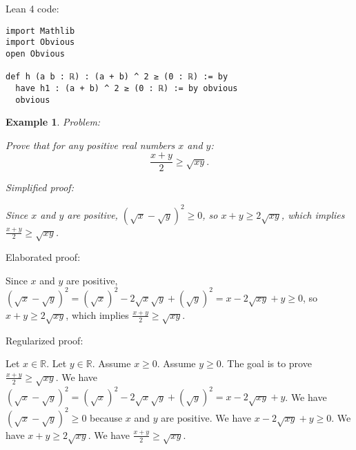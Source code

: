 \documentclass{article}
\newtheorem{example}{Example}
\begin{document}
Lean 4 code:
\begin{tcolorbox}[colback=white!10, width=\linewidth]
\begin{lstlisting}[language=Lean4]
import Mathlib
import Obvious
open Obvious

def h (a b : ℝ) : (a + b) ^ 2 ≥ (0 : ℝ) := by
  have h1 : (a + b) ^ 2 ≥ (0 : ℝ) := by obvious
  obvious

\end{lstlisting}
\end{tcolorbox}


\begin{example}
Problem:
\begin{tcolorbox}[colback=yellow!10, width=\linewidth]
Prove that for any positive real numbers $x$ and $y$:
    $$\frac{x+y}{2} \geq \sqrt{xy}.$$
\end{tcolorbox}

Simplified proof:
\begin{tcolorbox}[colback=blue!10, width=\linewidth]
Since $x$ and $y$ are positive, $(\sqrt x - \sqrt y)^2 \ge 0$, so $x+y \ge 2\sqrt{xy}$, which implies $\frac{x+y}{2} \ge \sqrt{xy}$.
\end{tcolorbox}
\end{example}

Elaborated proof:
\begin{tcolorbox}[colback=green!10, width=\linewidth]
Since $x$ and $y$ are positive, $(\sqrt x - \sqrt y)^2 = (\sqrt{x})^2 - 2\sqrt{x}\sqrt{y} + (\sqrt{y})^2= x - 2\sqrt{xy} + y \ge 0$, so $x+y \ge 2\sqrt{xy}$, which implies $\frac{x+y}{2} \ge \sqrt{xy}$.
\end{tcolorbox}

Regularized proof:
\begin{tcolorbox}[colback=red!10, width=\linewidth]
Let $x\in\mathbb{R}$.
Let $y\in\mathbb{R}$.
Assume $x\ge 0$.
Assume $y\ge 0$.
The goal is to prove $\frac{x+y}{2} \ge \sqrt{xy}$.
We have ${{(\sqrt x - \sqrt y)}}^2 = {{(\sqrt{x})}}^2 - 2\sqrt{x}\sqrt{y} + {{(\sqrt{y})}}^2= x - 2\sqrt{xy} + y$.
We have ${{(\sqrt x - \sqrt y)}}^2 \ge 0$ because $x$ and $y$ are positive.
We have $x - 2\sqrt{xy} + y \ge 0$.
We have $x+y \ge 2\sqrt{xy}$.
We have $\frac{x+y}{2} \ge \sqrt{xy}$.
\end{tcolorbox}
\end{document}
